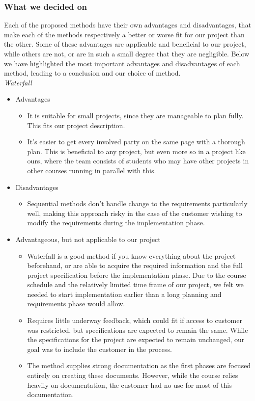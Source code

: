 \subsubsection{What we decided on}
Each of the proposed methods have their own advantages and disadvantages, that make each of the methods respectively a better or worse fit for our project than the other. Some of these advantages are applicable and beneficial to our project, while others are not, or are in such a small degree that they are negligible. Below we have highlighted the most important advantages and disadvantages of each method, leading to a conclusion and our choice of method. \\
\emph{Waterfall}
\begin{itemize}
\item Advantages
	\begin{itemize}
		\item It is suitable for small projects, since they are manageable to plan fully. This fits our project description.
		\item It's easier to get every involved party on the same page with a thorough plan. This is beneficial to any project, but even more so in a project like ours, where the team consists of students who may have other projects in other courses running in parallel with this.
	\end{itemize}
\item Disadvantages
	\begin{itemize}
		\item Sequential methods don't handle change to the requirements particularly well, making this approach risky in the case of the customer wishing to modify the requirements during the implementation phase.
	\end{itemize}
\item Advantageous, but not applicable to our project
	\begin{itemize}
		\item Waterfall is a good method if you know everything about the project beforehand, or are able to acquire the required information and the full project specification before the implementation phase. Due to the course schedule and the relatively limited time frame of our project, we felt we needed to start implementation earlier than a long planning and requirements phase would allow.
		\item Requires little underway feedback, which could fit if access to customer was restricted, but specifications are expected to remain the same. While the specifications for the project are expected to remain unchanged, our goal was to include the customer in the process.
		\item The method supplies strong documentation as the first phases are focused entirely on creating these documents. However, while the course relies heavily on documentation, the customer had no use for most of this documentation.
	\end{itemize}
\end{itemize}

